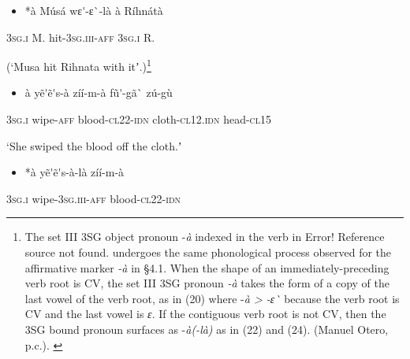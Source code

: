 \documentclass[output=paper]{langsci/langscibook}
\begin{document}
{{\begin{itemize}
\item \begin{styleNumberedEX}
\label{bkm:Ref424201687}*\`{a}    M\'{u}s\'{a}    wɛ\'{ }-ɛ\`{ }-l\`{a}    \`{a}    R\'{i}hn\'{a}t\`{a}
\end{styleNumberedEX}\end{itemize}
\begin{styleGloss}
\textsc{3sg.i  }  M.    hit-\textsc{3sg.iii-aff}  \textsc{3sg.i  }  R.
\end{styleGloss}

\begin{styleTranslation}
(‘Musa hit Rihnata with itʼ.)\footnote{ {The set III 3SG object pronoun -}{\textit{\`{a}}}{ indexed in the verb in }{Error! Reference source not found.}{ undergoes the same phonological process observed for the affirmative marker }{\textit{{}-\`{a}}}{ in §4.1. When the shape of an immediately-preceding verb root is CV, the  set III 3SG pronoun }{\textit{{}-\`{a}}}{ takes the form of a copy of the last vowel of the verb root, as in }{(20)}{ where -}{\textit{\`{a} {\textgreater} -ɛ\`{ }}}{ because the verb root is CV and the last vowel is}{\textit{ ɛ}}{. If the contiguous verb root is not CV, then the 3SG bound pronoun surfaces as -}{\textit{\`{a}(-l\`{a})}}{ as in }{(22)}{ and }{(24)}{. (Manuel Otero, p.c.).  }}
\end{styleTranslation}

\begin{itemize}
\item \begin{styleNumberedEX}
\label{bkm:Ref424201761}\`{a}    y\~{e}\'{ }\~{e}\'{ }s-\`{a}    z\'{i}\'{i}-m-\`{a}    f\~{u}\'{ }-g\~{a}\`{ }      z\'{u}-g\`{u}
\end{styleNumberedEX}\end{itemize}
\begin{styleGloss}
\textsc{3sg.i  }  wipe-\textsc{aff}  blood-\textsc{cl22-idn}  cloth-\textsc{cl12.idn}  head-\textsc{cl15}
\end{styleGloss}

\begin{styleTranslation}
‘She swiped the blood off the cloth.ʼ
\end{styleTranslation}

\begin{itemize}
\item \begin{styleNumberedEX}
\label{bkm:Ref424201769}*\`{a}    y\~{e}\'{ }\~{e}\'{ }s-\`{a}-l\`{a}    z\'{i}\'{i}-m-\`{a}
\end{styleNumberedEX}\end{itemize}
\begin{styleGloss}
\textsc{3sg.i  }  wipe-\textsc{3sg.iii-aff}  blood-\textsc{cl22-idn}
\end{styleGloss}

}}
\end{document}
